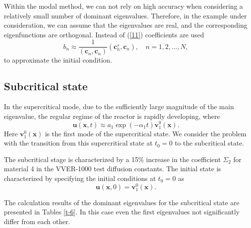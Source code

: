 \documentclass[a4paper]{jpconf}
\begin{document}
Within the modal method, we can not rely on high accuracy when considering a relatively small number of dominant eigenvalues. Therefore, in the example under consideration, we can assume that the eigenvalues are real, and the corresponding eigenfunctions are orthogonal. Instead of (\ref{11}) coefficients are used 
\begin{equation}\label{13}
 b_n \approx  \frac{1}{(\bm c_n, \bm c_n)} (\bm c_h^s, \bm c_n),
 \quad n = 1,2, ..., N ,
\end{equation}
to approximate the initial condition.

\subsection{Subcritical state} 

In the supercritical mode, due to the sufficiently large magnitude of the main eigenvalue, the regular regime of the reactor is rapidly developing, where 
\[
 \bm u (\bm x, t) \approx a_1 \exp(-\alpha_1 t) \bm v_1^0 (\bm x) .
\] 
Here  $\bm v_1^0 (\bm x)$ is the first mode of the supercritical state. We consider the problem with the transition from this supercritical state at  $t_0 = 0$  to the subcritical state.

The subcritical stage is characterized by a 15\% increase in the coefficient  
$\Sigma_2$ for material 4 in the VVER-1000 test diffusion constants. %
The initial state is characterized by specifying the initial conditions at $t_0 = 0$ as
\begin{equation}\label{14}
 \bm u (\bm x, 0) = \bm v_1^0 (\bm x) . 
\end{equation} 

The calculation results of  the dominant eigenvalues for the subcritical state are presented in Tables \ref{t-6}. In this case even the first eigenvalues not significantly differ from each other. 
\end{document}
